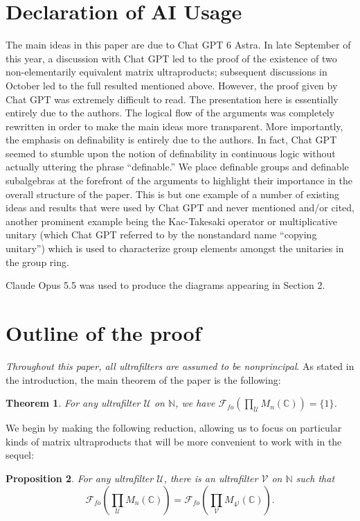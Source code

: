 \documentclass[12pt]{amsart}
\numberwithin{equation}{section}
\newtheorem{thm}{Theorem}[section]
\newtheorem{prop}[thm]{Proposition}
\theoremstyle{definition}
\newcommand{\C}{\mathbb{C}}
\newcommand{\N}{\mathbb{N}}
\def\cal{\mathcal}
\newcommand\cU{{\cal U}}
\begin{document}
\section*{Declaration of AI Usage}

The main ideas in this paper are due to Chat GPT 6 Astra.  In late September of this year, a discussion with Chat GPT led to the proof of the existence of two non-elementarily equivalent matrix ultraproducts; subsequent discussions in October led to the full resulted mentioned above.  However, the proof given by Chat GPT was extremely difficult to read.  The presentation here is essentially entirely due to the authors.  The logical flow of the arguments was completely rewritten in order to make the main ideas more transparent.  More importantly, the emphasis on definability is entirely due to the authors.  In fact, Chat GPT seemed to stumble upon the notion of definability in continuous logic without actually uttering the phrase ``definable.''  We place definable groups and definable subalgebras at the forefront of the arguments to highlight their importance in the overall structure of the paper.  This is but one example of a number of existing ideas and results that were used by Chat GPT and never mentioned and/or cited, another prominent example being the Kac-Takesaki operator  or multiplicative unitary (which Chat GPT referred to by the nonstandard name ``copying unitary'') which is used to characterize group elements amongst the unitaries in the group ring.

Claude Opus 5.5 was used to produce the diagrams appearing in Section 2.

\section{Outline of the proof}

\emph{Throughout this paper, all ultrafilters are assumed to be nonprincipal}.  As stated in the introduction, the main theorem of the paper is the following:

\begin{thm}\label{thm:trivial}
For any ultrafilter $\cU$ on $\N$, we have $\mathcal{F}_{fo}(\prod_\cU M_n(\C))=\{1\}$.
\end{thm}

We begin by making the following reduction, allowing us to focus on particular kinds of matrix ultraproducts that will be more convenient to work with in the sequel:

\begin{prop}
For any ultrafilter $\cU$, there is an ultrafilter $\mathcal{V}$ on $\N$ such that $$\mathcal{F}_{fo}(\prod_\cU M_{n}(\C))= \mathcal{F}_{fo}(\prod_{\mathcal{V}}M_{4^j}(\mathbb C)).$$
\end{prop}
\end{document}
